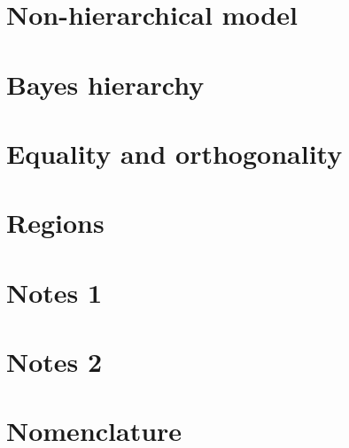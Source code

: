 \documentclass[preprint,12pt]{elsarticle}
\begin{document}
\section{Non-hierarchical model} \label{sec:Non_Hierarchical}


\section{Bayes hierarchy} \label{sec:Bayes_hierarchy}


\section{Equality and orthogonality} \label{sec:Eq_Orth}


\section{Regions} \label{sec:Regions}


\section{Notes 1} \label{sec:Notes_1}


\section{Notes 2} \label{sec:Notes_2}


\clearpage
\section{Nomenclature} \label{sec:Nomenclature}



 

\end{document}
